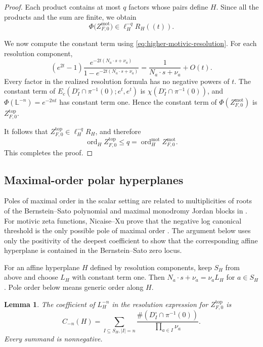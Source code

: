\documentclass[12pt]{amsart}
\numberwithin{equation}{section}
\theoremstyle{plain}
\newtheorem{lemma}[theorem]{Lemma}
\theoremstyle{definition}
\theoremstyle{remark}
\theoremstyle{definition}
\DeclareMathOperator{\ord}{ord}
\newcommand{\Lef}{\mathbb L}
\begin{document}
\begin{proof}
Each product contains at most $q$ factors whose pairs define $H$. Since all the products and the sum are finite, we obtain
\[
\Phi\bigl(Z^{\mathrm{mot}}_{F,0}\bigr)
\in \ell_H^{-q}R_H((t)).
\]

We now compute the constant term using \eqref{eq:higher-motivic-resolution}. For each resolution component,
\[
(e^{2t}-1)
\frac{e^{-2t(N_a\cdot s+\nu_a)}}{1-e^{-2t(N_a\cdot s+\nu_a)}}
=
\frac{1}{N_a\cdot s+\nu_a}+O(t).
\]
Every factor in the realized resolution formula has no negative powers of $t$. The constant term of $E_c(D_I^\circ\cap\pi^{-1}(0);e^t,e^t)$ is $\chi(D_I^\circ\cap\pi^{-1}(0))$, and $\Phi(\Lef^{-n})=e^{-2nt}$ has constant term one. Hence the constant term of $\Phi(Z^{\mathrm{mot}}_{F,0})$ is $Z^{\mathrm{top}}_{F,0}$.

It follows that $Z^{\mathrm{top}}_{F,0}\in\ell_H^{-q}R_H$, and therefore
\[
\ord_HZ^{\mathrm{top}}_{F,0}
\leq q
=
\ord_H^{\mathrm{mot}}Z^{\mathrm{mot}}_{F,0}.
\]
This completes the proof.
\end{proof}



\subsection{Maximal-order polar hyperplanes}

Poles of maximal order in the scalar setting are related to multiplicities of roots of the Bernstein--Sato polynomial and maximal monodromy Jordan blocks in \cite{MelleTorrelliVeys2009}. For motivic zeta functions, Nicaise--Xu prove that the negative log canonical threshold is the only possible pole of maximal order \cite{NicaiseXu2016}. The argument below uses only the positivity of the deepest coefficient to show that the corresponding affine hyperplane is contained in the Bernstein--Sato zero locus.


For an affine hyperplane $H$ defined by resolution components, keep $S_H$ from above and choose $L_H$ with constant term one. Then $N_a\cdot s+\nu_a=\nu_aL_H$ for $a\in S_H$. Pole order below means generic order along $H$.

\begin{lemma}
\label{lem:deepest-coefficient}
The coefficient of $L_H^{-n}$ in the resolution expression for $Z^{\mathrm{top}}_{F,0}$ is
\begin{equation}\label{eq:deepest-coefficient}
 C_{-n}(H) = \sum_{I\subseteq S_H,|I|=n}\frac{\#(D_I^\circ\cap\pi^{-1}(0))}{\prod_{a\in I}\nu_a}.
\end{equation}
Every summand is nonnegative.
\end{lemma}
\end{document}
